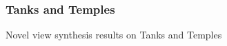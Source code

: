
\subsubsection{Tanks and Temples}\label{sec:nerf-evaluation-results-tanks-and-temples}
Novel view synthesis results on Tanks and Temples

